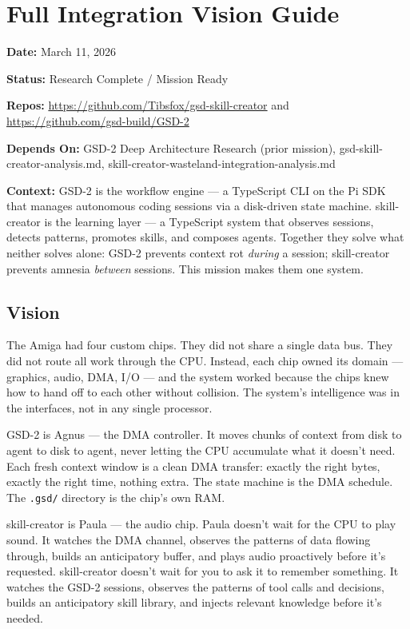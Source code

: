 \documentclass[11pt,letterpaper]{article}
\newcommand{\metafield}[2]{\textbf{\sffamily #1} #2\par}
\begin{document}
\section{Full Integration Vision Guide}

\metafield{Date:}{March 11, 2026}
\metafield{Status:}{Research Complete / Mission Ready}
\metafield{Repos:}{\url{https://github.com/Tibsfox/gsd-skill-creator} and \url{https://github.com/gsd-build/GSD-2}}
\metafield{Depends On:}{GSD-2 Deep Architecture Research (prior mission), gsd-skill-creator-analysis.md, skill-creator-wasteland-integration-analysis.md}
\metafield{Context:}{GSD-2 is the workflow engine --- a TypeScript CLI on the Pi SDK that manages autonomous coding sessions via a disk-driven state machine. skill-creator is the learning layer --- a TypeScript system that observes sessions, detects patterns, promotes skills, and composes agents. Together they solve what neither solves alone: GSD-2 prevents context rot \emph{during} a session; skill-creator prevents amnesia \emph{between} sessions. This mission makes them one system.}

\subsection{Vision}

The Amiga had four custom chips. They did not share a single data bus. They did not route all work through the CPU. Instead, each chip owned its domain --- graphics, audio, DMA, I/O --- and the system worked because the chips knew how to hand off to each other without collision. The system's intelligence was in the interfaces, not in any single processor.

GSD-2 is Agnus --- the DMA controller. It moves chunks of context from disk to agent to disk to agent, never letting the CPU accumulate what it doesn't need. Each fresh context window is a clean DMA transfer: exactly the right bytes, exactly the right time, nothing extra. The state machine is the DMA schedule. The \texttt{.gsd/} directory is the chip's own RAM.

skill-creator is Paula --- the audio chip. Paula doesn't wait for the CPU to play sound. It watches the DMA channel, observes the patterns of data flowing through, builds an anticipatory buffer, and plays audio proactively before it's requested. skill-creator doesn't wait for you to ask it to remember something. It watches the GSD-2 sessions, observes the patterns of tool calls and decisions, builds an anticipatory skill library, and injects relevant knowledge before it's needed.
\end{document}
